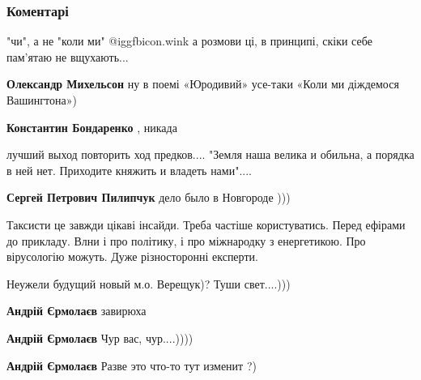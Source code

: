  
 
 
 
 
\subsubsection{Коментарі}

\begin{itemize} %

"чи", а не "коли ми"  @igg{fbicon.wink}  а розмови ці, в принципі, скіки себе пам'ятаю не
вщухають...

\begin{itemize} %
\textbf{Олександр Михельсон} ну в поемі «Юродивий» усе-таки «Коли ми діждемося Вашингтона»)

\textbf{Константин Бондаренко} , никада
\end{itemize} %


лучший выход повторить ход предков.... "Земля наша велика и обильна, а порядка
в ней нет. Приходите княжить и владеть нами"....

\begin{itemize} %
\textbf{Сергей Петрович Пилипчук} дело было в Новгороде )))
\end{itemize} %


Таксисти це завжди цікаві інсайди. Треба частіше користуватись. Перед ефірами
до прикладу. Влни і про політику, і про міжнародку з енергетикою. Про
вірусологію можуть. Дуже різносторонні експерти.


Неужели будущий новый м.о. Верещук)? Туши свет....)))

\begin{itemize} %
\textbf{Андрій Єрмолаєв} завирюха

\textbf{Андрій Єрмолаєв} Чур вас, чур....))))

\textbf{Андрій Єрмолаєв} Разве это что-то тут изменит ?)


\end{itemize}
\end{itemize}
